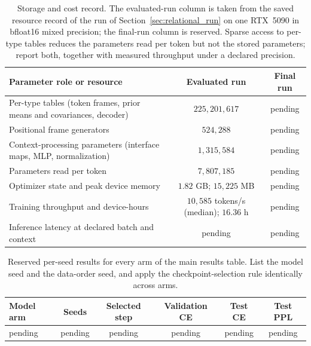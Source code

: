 \documentclass[twoside,11pt]{article}
\begin{document}
\begin{table}[htbp]
\centering
\small
\begin{tabularx}{\linewidth}{@{}>{\raggedright\arraybackslash}Xcc@{}}
\toprule
Parameter role or resource & Evaluated run & Final run \\
\midrule
Per-type tables (token frames, prior means and covariances, decoder) & $225{,}201{,}617$ & pending \\ %
Positional frame generators & $524{,}288$ & pending \\ %
Context-processing parameters (interface maps, MLP, normalization) & $1{,}315{,}584$ & pending \\ %
Parameters read per token & $7{,}807{,}185$ & pending \\ %
Optimizer state and peak device memory & $1.82$ GB; $15{,}225$ MB & pending \\ %
Training throughput and device-hours & $10{,}585$ tokens/s (median); $16.36$ h & pending \\ %
Inference latency at declared batch and context & pending & pending \\
\bottomrule
\end{tabularx}
\caption{Storage and cost record. The evaluated-run column is taken from the saved resource record of the run of Section~\ref{sec:relational_run} on one RTX~5090 in bfloat16 mixed precision; the final-run column is reserved. Sparse access to per-type tables reduces the parameters read per token but not the stored parameters; report both, together with measured throughput under a declared precision.}
\label{tab:placeholder_resources}
\end{table}

\begin{table}[htbp]
\centering
\small
\begin{tabular}{lccccc}
\toprule
Model arm & Seeds & Selected step & Validation CE & Test CE & Test PPL \\
\midrule
pending & pending & pending & pending & pending & pending \\
\bottomrule
\end{tabular}
\caption{Reserved per-seed results for every arm of the main results table. List the model seed and the data-order seed, and apply the checkpoint-selection rule identically across arms.}
\label{tab:placeholder_per_seed}
\end{table}
\end{document}

